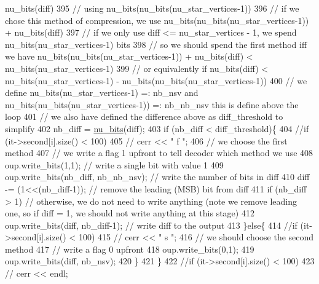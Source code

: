 \begin{DoxyCode}
{       nu\_bits(diff) }
395         \textcolor{comment}{// using nu\_bits(nu\_bits(nu\_star\_vertices-1))}
396         \textcolor{comment}{// if we chose this method of compression, we use nu\_bits(nu\_bits(nu\_star\_vertices-1)) +
       nu\_bits(diff)}
397         \textcolor{comment}{// if we only use diff <= nu\_star\_vertices - 1, we spend nu\_bits(nu\_star\_vertices-1) bits}
398         \textcolor{comment}{// so we should spend the first method iff we have nu\_bits(nu\_bits(nu\_star\_vertices-1)) +
       nu\_bits(diff) < nu\_bits(nu\_star\_vertices-1)}
399         \textcolor{comment}{// or equivalently if nu\_bits(diff) < nu\_bits(nu\_star\_vertices-1) -
       nu\_bits(nu\_bits(nu\_star\_vertices-1))}
400         \textcolor{comment}{// we define  nu\_bits(nu\_star\_vertices-1) =: nb\_nsv and nu\_bits(nu\_bits(nu\_star\_vertices-1)) =:
       nb\_nb\_nsv this is define above the loop}
401         \textcolor{comment}{// we also have defined the difference above as diff\_threshold to simplify}
402         nb\_diff = \hyperlink{bitstream_8cpp_a9dfce6f51e3febb3973aa3b16c2fecb4}{nu\_bits}(diff);
403         \textcolor{keywordflow}{if} (nb\_diff < diff\_threshold)\{
404           \textcolor{comment}{//if (it->second[i].size() < 100)}
405           \textcolor{comment}{//  cerr << " f ";}
406           \textcolor{comment}{// we choose the first method}
407           \textcolor{comment}{// we write a flag 1 upfront to tell decoder which method we use}
408           oup.write\_bits(1,1); \textcolor{comment}{// write a single bit with value 1}
409           oup.write\_bits(nb\_diff, nb\_nb\_nsv); \textcolor{comment}{// write the number of bits in diff }
410           diff -= (1<<(nb\_diff-1)); \textcolor{comment}{// remove the leading (MSB) bit from diff}
411           \textcolor{keywordflow}{if} (nb\_diff > 1) \textcolor{comment}{// otherwise, we do not need to write anything (note we remove leading one, so
       if diff = 1, we should not write anything at this stage)}
412             oup.write\_bits(diff, nb\_diff-1); \textcolor{comment}{// write diff to the output}
413         \}\textcolor{keywordflow}{else}\{
414           \textcolor{comment}{//if (it->second[i].size() < 100)}
415           \textcolor{comment}{//  cerr << " s ";}
416           \textcolor{comment}{// we should choose the second method}
417           \textcolor{comment}{// write a flag 0 upfront}
418           oup.write\_bits(0,1);
419           oup.write\_bits(diff, nb\_nsv);
420         \}
421       \}
422       \textcolor{comment}{//if (it->second[i].size() < 100)}
423       \textcolor{comment}{//  cerr << endl;}

\end{DoxyCode}
